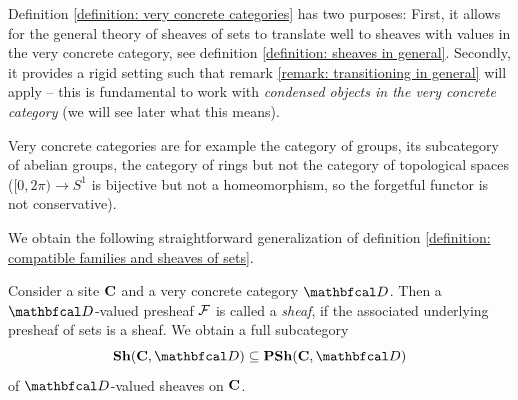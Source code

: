 \begin{remark}
	Definition \ref{definition: very concrete categories} has two purposes: First, it allows for the general theory of sheaves of sets to translate well to sheaves with values in the very concrete category, see definition \ref{definition: sheaves in general}. Secondly, it provides a rigid setting such that remark \ref{remark: transitioning in general} will apply -- this is fundamental to work with \emph{condensed objects in the very concrete category} (we will see later what this means).
\end{remark}

\begin{example}
	Very concrete categories are for example the category of groups, its subcategory of abelian groups, the category of rings but not the category of topological spaces (\eg $[0, 2\pi) \to S^1$ is bijective but not a homeomorphism, so the forgetful functor is not conservative).
\end{example}

We obtain the following straightforward generalization of definition \ref{definition: compatible families and sheaves of sets}.
\begin{definition}
	\label{definition: sheaves in general}
	
	Consider a site ${{\mathbf{C}}}$ and a very concrete category $\category D$. Then a $\category D$-valued presheaf ${\mathcal{F}}$ is called a \emph{sheaf}, if the associated underlying presheaf of sets is a sheaf. We obtain a full subcategory
		$$\Sheaves{\site C}{\category D} \subseteq \Presheaves{\site C}{\category D}$$
	of $\category D$-valued sheaves on ${{\mathbf{C}}}$.
\end{definition}

